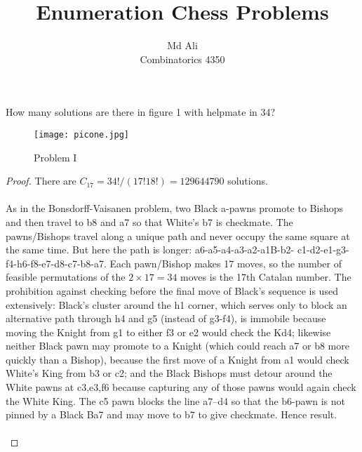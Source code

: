 \documentclass[12pt]{article}
\newenvironment{problem}[2][Problem]{\begin{trivlist}
\item[\hskip \labelsep {\bfseries #1}\hskip \labelsep {\bfseries #2.}]}{\end{trivlist}}
\begin{document}
 
 
\title{Enumeration Chess Problems}%
\author{Md Ali\\ %
Combinatorics 4350} %
 
\maketitle
 
\begin{problem}{I} %
How many solutions are there in figure 1 with helpmate in 34?

\end{problem}
 \begin{figure}[htbp] %
    \centering
    \texttt{[image: picone.jpg]} 
    \caption{Problem I}
    \label{fig}
 \end{figure}

\begin{proof}
There are $C_{17} = 34!/(17!18!) = 129644790$ solutions. \\ \\
As in the Bonsdorff-Vaisanen problem, two Black a-pawns promote to Bishops and then travel to b8 and a7 so that White’s b7 is checkmate. The pawns/Bishops travel along a unique path and never occupy the same square at the same time. But here the path is longer: a6-a5-a4-a3-a2-a1B-b2- c1-d2-e1-g3-f4-h6-f8-e7-d8-c7-b8-a7. Each pawn/Bishop makes 17 moves, so the number of feasible permutations of the $2 \times17 = 34$ moves is the 17th Catalan number. The prohibition against checking before the final move of Black’s sequence is used extensively: Black’s cluster around the h1 corner, which serves only to block an alternative path through h4 and g5 (instead of g3-f4), is immobile because moving the Knight from g1 to either f3 or e2 would check the Kd4; likewise neither Black pawn may promote to a Knight (which could reach a7 or b8 more quickly than a Bishop), because the first move of a Knight from a1 would check White’s King from b3 or c2; and the Black Bishops must detour around the White pawns at c3,e3,f6 because capturing any of those pawns would again check the White King. The c5 pawn blocks the line a7–d4 so that the b6-pawn is not pinned by a Black Ba7 and may move to b7 to give checkmate. Hence result. \\ \\
\end{proof}
\end{document}

